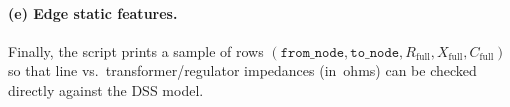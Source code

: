 \documentclass[11pt]{article}
\begin{document}
\paragraph{(e) Edge static features.}
Finally, the script prints a sample of rows
$(\texttt{from\_node},\texttt{to\_node},R_{\mathrm{full}},X_{\mathrm{full}},C_{\mathrm{full}})$
so that line vs.\ transformer/regulator impedances (in~ohms) can be checked
directly against the DSS model.
\end{document}
